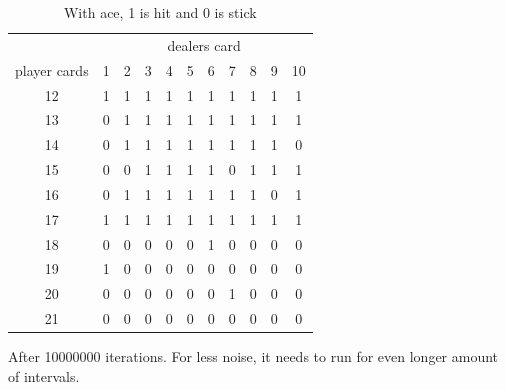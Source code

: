 \documentclass{article}
\begin{document}
    \begin{table}[H]
    \centering
    \begin{tabular}{c|c|c|c|c|c|c|c|c|c|c}
    &\multicolumn{10}{c}{dealers card} \\
    player cards&1 & 2 & 3 & 4 & 5 & 6 & 7 & 8 & 9 & 10 \\
            \hline
    12 & 1 & 1 & 1 & 1 & 1 & 1 & 1 & 1 & 1 & 1 \\
    13 & 0 & 1 & 1 & 1 & 1 & 1 & 1 & 1 & 1 & 1 \\
    14 & 0 & 1 & 1 & 1 & 1 & 1 & 1 & 1 & 1 & 0 \\
    15 & 0 & 0 & 1 & 1 & 1 & 1 & 0 & 1 & 1 & 1 \\
    16 & 0 & 1 & 1 & 1 & 1 & 1 & 1 & 1 & 0 & 1 \\
    17 & 1 & 1 & 1 & 1 & 1 & 1 & 1 & 1 & 1 & 1 \\
    18 & 0 & 0 & 0 & 0 & 0 & 1 & 0 & 0 & 0 & 0 \\
    19 & 1 & 0 & 0 & 0 & 0 & 0 & 0 & 0 & 0 & 0 \\
    20 & 0 & 0 & 0 & 0 & 0 & 0 & 1 & 0 & 0 & 0 \\
    21 & 0 & 0 & 0 & 0 & 0 & 0 & 0 & 0 & 0 & 0 \\
    \end{tabular}
    \caption{With ace, 1 is hit and 0 is stick}
\end{table}

After 10000000 iterations. For less noise, it needs to run for even longer amount of intervals.
\end{document}
